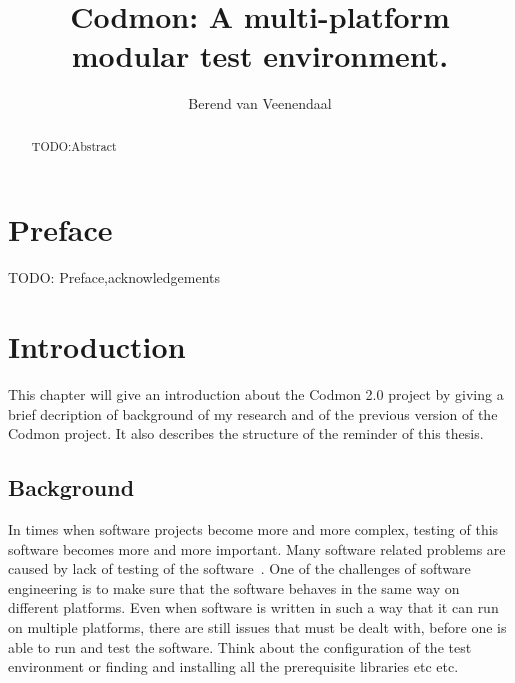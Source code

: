 \documentclass[a4paper,10pt]{scrartcl}
\title{Codmon: A multi-platform modular test environment.}
\author{Berend van Veenendaal}
\newcommand{\project}{Codmon 2.0}
\begin{document}
\maketitle

\begin{abstract}
TODO:Abstract
\end{abstract}
\newpage
\section*{Preface}
\label{sec:Preface}
TODO: Preface,acknowledgements
\newpage
\tableofcontents
\newpage

\section{Introduction}
\label{sec:Introduction}
This chapter will give an introduction about the \project{} project by giving a brief decription of background of my research and of the
previous version of the Codmon project. It also describes the structure of the reminder of this thesis.

\subsection{Background}
\label{sec:Background}
In times when software projects become more and more complex, testing of this software becomes more and more important. Many software
related problems are caused by lack of testing of the software~\cite{TTCST}. One of the challenges of software engineering is to make
sure that the software behaves in the same way on different platforms. Even when software is written in such a way that it can run on multiple platforms, there 
are still issues that must be dealt with, before one is able to run and test the software. Think about the configuration of the test environment 
or finding and installing all the prerequisite libraries etc etc. 
\end{document}
